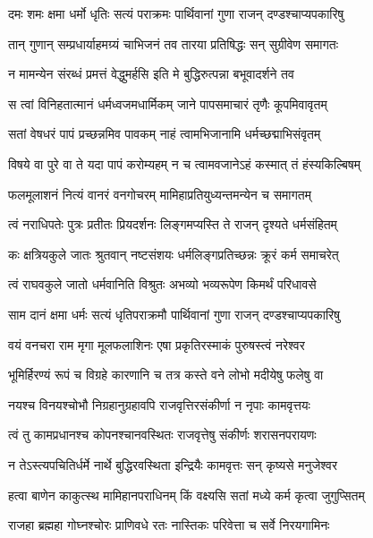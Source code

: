 \twolineshloka
{दमः शमः क्षमा धर्मो धृतिः सत्यं पराक्रमः}
{पार्थिवानां गुणा राजन् दण्डश्चाप्यपकारिषु} %

\twolineshloka
{तान् गुणान् सम्प्रधार्याहमग्र्यं चाभिजनं तव}
{तारया प्रतिषिद्धः सन् सुग्रीवेण समागतः} %

\twolineshloka
{न मामन्येन संरब्धं प्रमत्तं वेद्धुमर्हसि}
{इति मे बुद्धिरुत्पन्ना बभूवादर्शने तव} %

\twolineshloka
{स त्वां विनिहतात्मानं धर्मध्वजमधार्मिकम्}
{जाने पापसमाचारं तृणैः कूपमिवावृतम्} %

\twolineshloka
{सतां वेषधरं पापं प्रच्छन्नमिव पावकम्}
{नाहं त्वामभिजानामि धर्मच्छद्माभिसंवृतम्} %

\twolineshloka
{विषये वा पुरे वा ते यदा पापं करोम्यहम्}
{न च त्वामवजानेऽहं कस्मात् तं हंस्यकिल्बिषम्} %

\twolineshloka
{फलमूलाशनं नित्यं वानरं वनगोचरम्}
{मामिहाप्रतियुध्यन्तमन्येन च समागतम्} %

\twolineshloka
{त्वं नराधिपतेः पुत्रः प्रतीतः प्रियदर्शनः}
{लिङ्गमप्यस्ति ते राजन् दृश्यते धर्मसंहितम्} %

\twolineshloka
{कः क्षत्रियकुले जातः श्रुतवान् नष्टसंशयः}
{धर्मलिङ्गप्रतिच्छन्नः क्रूरं कर्म समाचरेत्} %

\twolineshloka
{त्वं राघवकुले जातो धर्मवानिति विश्रुतः}
{अभव्यो भव्यरूपेण किमर्थं परिधावसे} %

\twolineshloka
{साम दानं क्षमा धर्मः सत्यं धृतिपराक्रमौ}
{पार्थिवानां गुणा राजन् दण्डश्चाप्यपकारिषु} %

\twolineshloka
{वयं वनचरा राम मृगा मूलफलाशिनः}
{एषा प्रकृतिरस्माकं पुरुषस्त्वं नरेश्वर} %

\twolineshloka
{भूमिर्हिरण्यं रूपं च विग्रहे कारणानि च}
{तत्र कस्ते वने लोभो मदीयेषु फलेषु वा} %

\twolineshloka
{नयश्च विनयश्चोभौ निग्रहानुग्रहावपि}
{राजवृत्तिरसंकीर्णा न नृपाः कामवृत्तयः} %

\twolineshloka
{त्वं तु कामप्रधानश्च कोपनश्चानवस्थितः}
{राजवृत्तेषु संकीर्णः शरासनपरायणः} %

\twolineshloka
{न तेऽस्त्यपचितिर्धर्मे नार्थे बुद्धिरवस्थिता}
{इन्द्रियैः कामवृत्तः सन् कृष्यसे मनुजेश्वर} %

\twolineshloka
{हत्वा बाणेन काकुत्स्थ मामिहानपराधिनम्}
{किं वक्ष्यसि सतां मध्ये कर्म कृत्वा जुगुप्सितम्} %

\twolineshloka
{राजहा ब्रह्महा गोघ्नश्चोरः प्राणिवधे रतः}
{नास्तिकः परिवेत्ता च सर्वे निरयगामिनः} %

